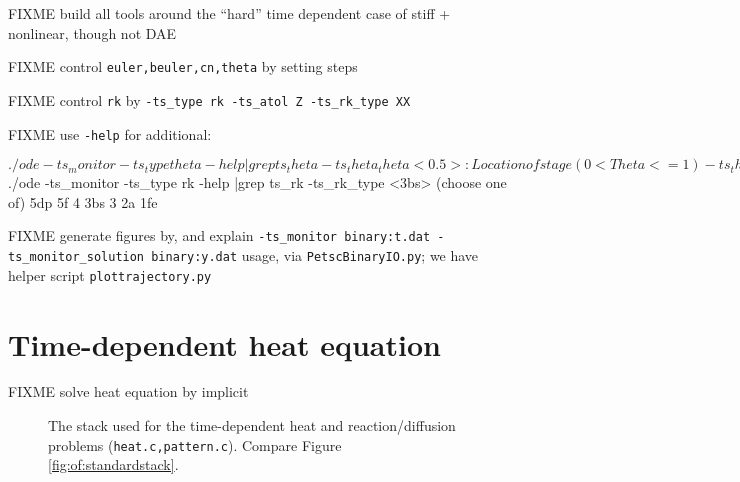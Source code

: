 FIXME build all tools around the ``hard'' time dependent case of stiff + nonlinear, though not DAE

FIXME control \texttt{euler,beuler,cn,theta} by setting steps

FIXME control \texttt{rk} by \texttt{-ts\_type rk -ts\_atol Z -ts\_rk\_type XX}

FIXME use \texttt{-help} for additional:

\begin{cline}
$ ./ode -ts_monitor -ts_type theta -help |grep ts_theta
  -ts_theta_theta <0.5>: Location of stage (0<Theta<=1)
  -ts_theta_extrapolate: <FALSE> Extrapolate stage solution from previous ...
  -ts_theta_endpoint: <FALSE> Use the endpoint instead of midpoint form of ...
  -ts_theta_adapt: <FALSE> Use time-step adaptivity with the Theta method
$ ./ode -ts_monitor -ts_type rk -help |grep ts_rk
  -ts_rk_type <3bs> (choose one of) 5dp 5f 4 3bs 3 2a 1fe
\end{cline}

FIXME generate figures by, and explain \texttt{-ts\_monitor binary:t.dat -ts\_monitor\_solution binary:y.dat} usage, via \texttt{PetscBinaryIO.py}; we have helper script \texttt{plottrajectory.py}


\section{Time-dependent heat equation}

FIXME solve heat equation by implicit






\begin{figure}
\caption{The \PETSc stack used for the time-dependent heat and reaction/diffusion problems (\texttt{heat.c,pattern.c}).  Compare Figure \ref{fig:of:standardstack}.}
\label{fig:of:tsstack}
\end{figure}

